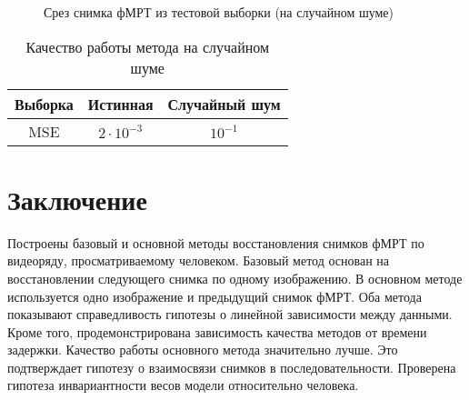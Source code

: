 \documentclass[a4paper, 12pt]{article}
\begin{document}
	\begin{figure}[h!]
		\centering
		\hfill
		\hfill
		\caption{Срез снимка фМРТ из тестовой выборки (на случайном шуме)}
		\label{fig:8}
	\end{figure}

	\begin{table}[h!]
		\centering
		\begin{tabular}{|c|c|c|}
			\hline
			Выборка	&	Истинная	&	Случайный шум \\ \hline \hline
			MSE		& 	$2 \cdot 10^{-3}$	 &		$10^{-1}$ \\ \hline
		\end{tabular}
		\caption{Качество работы метода на случайном шуме}
		\label{table:2}
	\end{table}

\newpage

\section{Заключение}

	Построены базовый и основной методы восстановления снимков фМРТ по видеоряду, просматриваемому
	человеком. Базовый метод основан на восстановлении следующего снимка по одному изображению.
	В основном методе используется одно изображение и предыдущий снимок фМРТ.
	Оба метода показывают справедливость гипотезы о линейной зависимости между данными.
	Кроме того, продемонстрирована зависимость качества методов от времени задержки.
	Качество работы основного метода значительно лучше.
	Это подтверждает гипотезу о взаимосвязи снимков в последовательности.
	Проверена гипотеза инвариантности весов модели относительно человека.

\newpage



\end{document}
